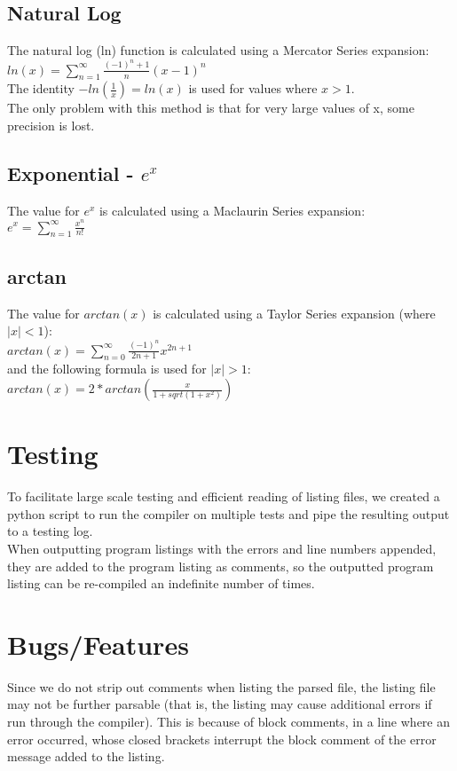 \documentclass{report}
\begin{document}
\subsection*{Natural Log}
The natural log (ln) function is calculated using a Mercator Series expansion:\\
$ ln(x) = \displaystyle\sum_{n=1}^{\infty} \frac{(-1)^n+1}{n} (x-1)^n $ \\
The identity $ -ln(\frac{1}{x}) = ln(x)$ is used for values where $x > 1$.\\
The only problem with this method is that for very large values of x, some precision is lost. 

\subsection*{Exponential - $e^x$}
The value for $e^x$ is calculated using a Maclaurin Series expansion:\\
$ e^x = \displaystyle\sum_{n=1}^{\infty} \frac{x^n}{n!}  $ \\

\subsection*{arctan}
The value for $arctan(x)$ is calculated using a Taylor Series expansion (where $|x| < 1 $): \\
$ arctan(x) = \displaystyle\sum_{n=0}^{\infty} \frac{(-1)^n}{2n+1} x^{2n+1} $ \\
and the following formula is used for $|x| >1$:\\
$arctan(x) = 2 * arctan(\frac{x}{1+sqrt(1+x^2)})$

\section*{Testing}
To facilitate large scale testing and efficient reading of listing files, we created a python script to run the compiler on multiple tests and pipe the resulting output to a testing log.\\
When outputting program listings with the errors and line numbers appended, they are added to the program listing as comments, so the outputted program listing can be re-compiled an indefinite number of times.


\section*{Bugs/Features}
Since we do not strip out comments when listing the parsed file, the listing file may not be further parsable (that is, the listing may cause additional errors if run through the compiler). This is because of block comments, in a line where an error occurred, whose closed brackets interrupt the block comment of the error message added to the listing.
\end{document}
